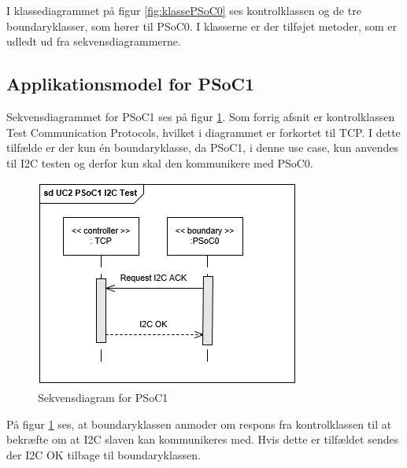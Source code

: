 I klassediagrammet på figur \ref{fig:klassePSoC0} ses kontrolklassen og de tre boundaryklasser, som hører til PSoC0. I klasserne er der tilføjet metoder, som er udledt ud fra sekvensdiagrammerne. 

\subsection{Applikationsmodel for PSoC1}
Sekvensdiagrammet for PSoC1 ses på figur \ref{fig:sekvensPSoC1I2CTest}. Som forrig afsnit er kontrolklassen Test Communication Protocols, hvilket i diagrammet er forkortet til TCP. I dette tilfælde er der kun én boundaryklasse, da PSoC1, i denne use case, kun anvendes til I2C testen og derfor kun skal den kommunikere med PSoC0. 

\begin{figure}[H]
	\centering
	\includegraphics[width=.8\textwidth] {Systemarkitektur/images/SDPSoC1I2CTest}
	\caption{Sekvensdiagram for PSoC1}
	\label{fig:sekvensPSoC1I2CTest}
\end{figure}

På figur \ref{fig:sekvensPSoC1I2CTest} ses, at boundaryklassen anmoder om respons fra kontrolklassen til at bekræfte om at I2C slaven kan kommunikeres med. Hvis dette er tilfældet sendes der I2C OK tilbage til boundaryklassen.  

